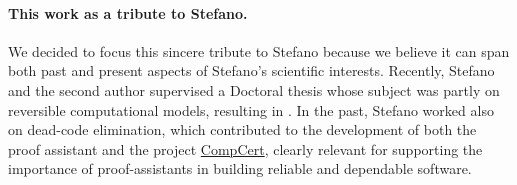 \paragraph{This work as a tribute to Stefano.}
We decided to focus this sincere tribute to Stefano because we believe it can span both past and present aspects of Stefano's scientific interests. 
Recently, Stefano and the second author supervised a Doctoral thesis whose subject was partly on reversible computational models, resulting in \cite{DBLP:journals/tcs/BarileBR25}. 
In the past, Stefano worked also on dead-code elimination, which contributed to the development of both the proof assistant \Coq and the project \href{https://en.wikipedia.org/wiki/CompCert}{\textsf{CompCert}}, clearly relevant for supporting the importance of proof-assistants in building reliable and dependable software.